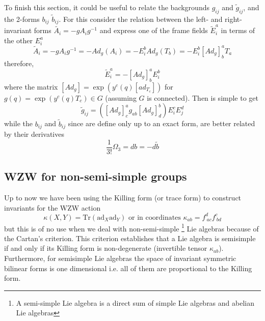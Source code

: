 \documentclass[a4paper,12pt]{article}
\numberwithin{equation}{section}
\numberwithin{thm}{section}
\numberwithin{exm}{section}
\newcommand{\ad}{\mathrm{ad}}
\newcommand{\tr}{\mathrm{Tr}}
\newcommand{\wt}{\widetilde}
\newcommand{\<}{{\langle}}
\renewcommand{\>}{{\rangle}}
\renewcommand{\k}{{\kappa}}
\newcommand{\Om}{{\Omega}}
\begin{document}
To finish this section, it could be useful to relate the backgrounds $g_{ij}$ and $\wt g_{ij}$, and the 2-forms $b_{ij}$ $\wt b_{ij}$. For this consider the relation between the left- and right-invariant forms $\wt{A_i}=-g A_i g^{-1}$ and express one of the frame fields $\wt{E}^a_i$ in terms of the other $E^a_i$
	\begin{equation}
	\wt{A}_i = -g A_i g^{-1} = - Ad_g(A_i) = - E^b_i Ad_g(T_b) = - E^b_i [Ad_g]^a_b T_a
	\end{equation}
therefore,
	\begin{equation}
	\wt{E}^a_i = -[Ad_g]^a_b E^b_i
	\end{equation}
where the matrix $[Ad_g]= \exp(y^c(q)[ad_{T_c}])$ for $g(q) = \exp(y^c(q) T_c)\in G$ (assuming $G$ is connected). Then is simple to get
	\begin{equation}
	\wt g_{ij} = ([Ad_g]^a_c g_{ab} [Ad_g]^b_d) E^c_i E^d_j
	\end{equation}
while the $b_{ij}$ and $\wt b_{ij}$ since are define only up to an exact form, are better related by their derivatives
	\begin{equation}
	\frac{1}{3!} \Om_3 = db = -d\wt b
	\end{equation}

\subsection{WZW for non-semi-simple groups}
Up to now we have been using the Killing form (or trace form) to construct invariants for the WZW action
	\begin{equation}
	\k(X, Y) = \tr ( \ad_X \ad_Y )\text{ or in coordinates } \k_{ab} = f^d_{\ ac}f^c_{\ bd}
	\end{equation}
but this is of no use when we deal with non-semi-simple%
\footnote{A semi-simple Lie algebra is a direct sum of simple Lie algebras and abelian Lie algebras}
Lie algebras because of the Cartan's criterion. This criterion establishes that a Lie algebra is semisimple if and only if its Killing form is non-degenerate (invertible tensor $\k_{ab}$). Furthermore, for semisimple Lie algebras the space of invariant symmetric bilinear forms is one dimensional i.e. all of them are proportional to the Killing form.
\end{document}
